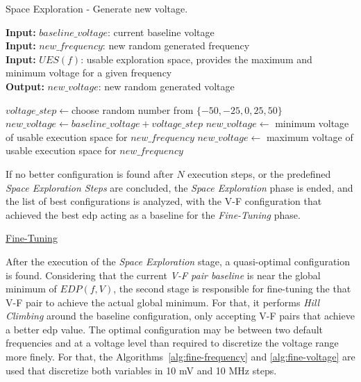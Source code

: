\begin{algorithm}
\caption{Space Exploration - Generate new voltage.}
    \label{alg:space-voltage} 
    \hspace*{\algorithmicindent} \textbf{Input:} $baseline\_voltage$: current baseline voltage \\
 \hspace*{\algorithmicindent} \textbf{Input:} $new\_frequency$: new random generated frequency \\
 \hspace*{\algorithmicindent} \textbf{Input:} $UES(f)$: usable exploration space, provides the maximum and minimum voltage for a given frequency \\
 \hspace*{\algorithmicindent} \textbf{Output:} $new\_voltage$: new random generated voltage
\begin{algorithmic}
\STATE $voltage\_step \leftarrow $choose random number from $\{-50, -25,0, 25, 50\}$
\STATE $new\_voltage \leftarrow baseline\_voltage + voltage\_step$
\STATE $new\_voltage \leftarrow$ minimum voltage of usable execution space for $new\_frequency$
\STATE $new\_voltage \leftarrow$ maximum voltage of usable execution space for $new\_frequency$
\ENDIF
\end{algorithmic}
\end{algorithm}

If no better configuration is found after $ N $ execution steps, or the predefined \textit{Space Exploration Steps} are concluded, the \textit{Space Exploration} phase is ended, and the list of best configurations is analyzed, with the V-F configuration that achieved the best \acrshort{edp} acting as a baseline for the \textit{Fine-Tuning} phase.


\bigskip
\underline{Fine-Tuning}
\bigskip

After the execution of the \textit{Space Exploration} stage, a quasi-optimal configuration is found. Considering that the current \textit{V-F pair baseline} is near the global minimum of $EDP(f, V)$, the second stage is responsible for fine-tuning the that V-F pair to achieve the actual global minimum. For that, it performs  \textit{Hill Climbing} around the baseline configuration, only accepting V-F pairs that achieve a better \acrshort{edp} value. The optimal configuration may be between two default frequencies and at a voltage level than required to discretize the voltage range more finely. For that, the Algorithms~\ref{alg:fine-frequency} and \ref{alg:fine-voltage} are used that discretize both variables in 10 mV and 10 MHz steps.

